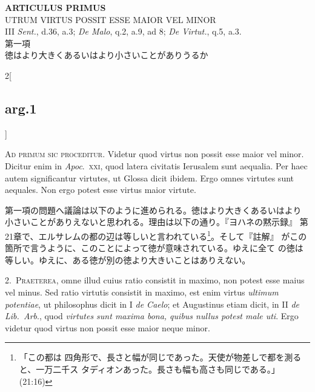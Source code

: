 \documentclass[paper=a4paper,fontsize=10pt,jafontsize=9pt,titlepage]{jlreq}
\begin{document}
\begin{center}
{\Large {\bfseries ARTICULUS PRIMUS}}\\
{\large UTRUM VIRTUS POSSIT ESSE MAIOR VEL MINOR}\\
{\footnotesize III {\itshape Sent.}, d.36, a.3; {\itshape De Malo}, q.2, a.9, ad 8; {\itshape De Virtut.}, q.5, a.3.}\\
{\Large 第一項\\徳はより大きくあるいはより小さいことがありうるか}
\end{center}

\begin{paracol}{2}[\subsection{arg.1}]

{\scshape Ad primum sic proceditur}. Videtur quod virtus non possit
 esse maior vel minor. Dicitur enim in {\itshape Apoc}.~{\scshape xxi}, quod latera
 civitatis Ierusalem sunt aequalia. Per haec autem significantur
 virtutes, ut Glossa dicit ibidem. Ergo omnes virtutes sunt
 aequales. Non ergo potest esse virtus maior virtute.

\switchcolumn

第一項の問題へ議論は以下のように進められる。徳はより大きくあるいはより
小さいことがありえないと思われる。理由は以下の通り。『ヨハネの黙示録』
第21章で、エルサレムの都の辺は等しいと言われている\footnote{「この都は
四角形で、長さと幅が同じであった。天使が物差しで都を測ると、一万二千ス
タディオンあった。長さも幅も高さも同じである。」(21:16)}。そして『註解』
がこの箇所で言うように、このことによって徳が意味されている。ゆえに全て
の徳は等しい。ゆえに、ある徳が別の徳より大きいことはありえない。


2.~{\scshape Praeterea}, omne illud cuius ratio consistit in maximo,
non potest esse maius vel minus. Sed ratio virtutis consistit in
maximo, est enim virtus {\itshape ultimum potentiae}, ut philosophus
dicit in I {\itshape de Caelo}; et Augustinus etiam dicit, in II
{\itshape de Lib.~Arb}., quod {\itshape virtutes sunt maxima bona,
quibus nullus potest male uti}. Ergo videtur quod virtus non possit
esse maior neque minor.

\switchcolumn


\end{paracol}
\end{document}

